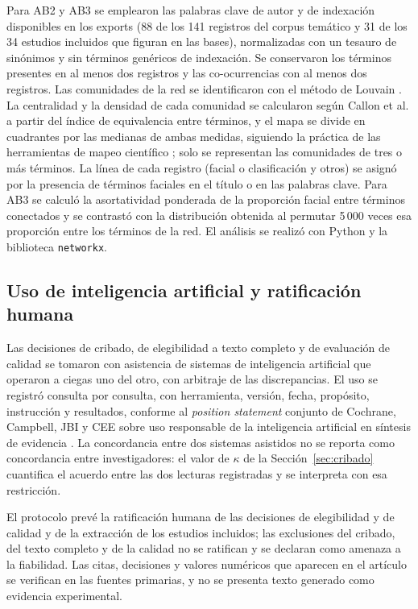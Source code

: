 \documentclass[pdflatex,sn-mathphys-num]{sn-jnl}
\theoremstyle{thmstyleone}
\theoremstyle{thmstyletwo}
\theoremstyle{thmstylethree}
\begin{document}
Para AB2 y AB3 se emplearon las palabras clave de autor y de indexación disponibles en los exports (88 de los 141 registros del corpus temático y 31 de los 34 estudios incluidos que figuran en las bases), normalizadas con un tesauro de sinónimos y sin términos genéricos de indexación. Se conservaron los términos presentes en al menos dos registros y las co-ocurrencias con al menos dos registros. Las comunidades de la red se identificaron con el método de Louvain \cite{blondel2008fast}. La centralidad y la densidad de cada comunidad se calcularon según Callon et al. \cite{callon1991coword} a partir del índice de equivalencia entre términos, y el mapa se divide en cuadrantes por las medianas de ambas medidas, siguiendo la práctica de las herramientas de mapeo científico \cite{cobo2011science,aria2017bibliometrix}; solo se representan las comunidades de tres o más términos. La línea de cada registro (facial o clasificación y otros) se asignó por la presencia de términos faciales en el título o en las palabras clave. Para AB3 se calculó la asortatividad ponderada de la proporción facial entre términos conectados y se contrastó con la distribución obtenida al permutar 5\,000 veces esa proporción entre los términos de la red. El análisis se realizó con Python y la biblioteca \texttt{networkx}.

\subsection{Uso de inteligencia artificial y ratificación humana}\label{sec:ia}

Las decisiones de cribado, de elegibilidad a texto completo y de evaluación de calidad se tomaron con asistencia de sistemas de inteligencia artificial que operaron a ciegas uno del otro, con arbitraje de las discrepancias. El uso se registró consulta por consulta, con herramienta, versión, fecha, propósito, instrucción y resultados, conforme al \emph{position statement} conjunto de Cochrane, Campbell, JBI y CEE sobre uso responsable de la inteligencia artificial en síntesis de evidencia \cite{flemyng2025position}. La concordancia entre dos sistemas asistidos no se reporta como concordancia entre investigadores: el valor de $\kappa$ de la Sección~\ref{sec:cribado} cuantifica el acuerdo entre las dos lecturas registradas y se interpreta con esa restricción.

El protocolo prevé la ratificación humana de las decisiones de elegibilidad y de calidad y de la extracción de los estudios incluidos; las exclusiones del cribado, del texto completo y de la calidad no se ratifican y se declaran como amenaza a la fiabilidad.%
{} Las citas, decisiones y valores numéricos que aparecen en el artículo se verifican en las fuentes primarias, y no se presenta texto generado como evidencia experimental.
\end{document}
